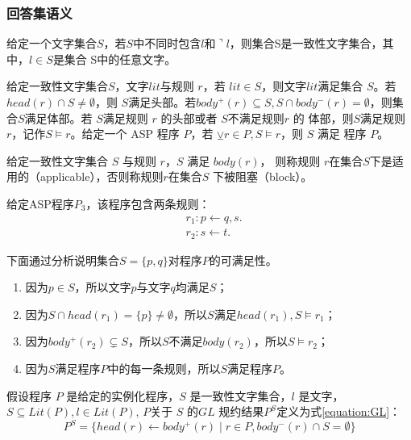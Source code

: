\subsubsection{回答集语义}
\begin{definition}[一致性文字集合]
    给定一个文字集合$S$，若$S$中不同时包含$l$和$\urcorner l$，则集合S是一致性文字集合，其中，$l \in S$是集合
    S中的任意文字。
\end{definition}
\begin{definition}
    给定一致性文字集合$S$，文字$lit$与规则 $r$，若
$lit \in S$，则文字$ lit $满足集合 $S$。若 $head(r)\cap S \neq \emptyset$，则 $S $满足头部。若$ body^+(r) \subseteq 
S, S ∩ body^−(r) = \emptyset$，则集合$ S $满足体部。若 $S $满足规则 $r$ 的头部或者 $S $不满足规则$ r$ 的
体部，则$ S$满足规则 $r$，记作$ S \models r$。给定一个 ASP 程序 $P$，若 $\veebar r \in P, S \models r$，则 $S$ 满足
程序 $P$。
\end{definition}
\begin{definition}[规则的适用与阻塞]
    给定一致性文字集合 $S$ 与规则 $r$，$S$ 满足 $body(r)$，
则称规则 $r $在集合$S $下是适用的（applicable），否则称规则$ r $在集合$ S$ 下被阻塞（block）。
\end{definition}
\begin{example}
    给定ASP程序$P_3$，该程序包含两条规则：
    \begin{align*}
        &r_1: p \leftarrow q, s. \\ 
        &r_2: s \leftarrow t.
    \end{align*}
\end{example}
下面通过分析说明集合$S=\{ p, q\}$对程序$P$的可满足性。
\begin{enumerate}[nosep]
    \item 因为$p\in S$，所以文字$p$与文字$q$均满足$S$；
    \item 因为$S \cap head(r_1) = \{ p \} \neq \emptyset$，所以$S$满足$head(r_1), S \models r_1$；
    \item 因为$body^+(r_2) \subsetneq S$，所以$S$不满足$body(r_2)$，所以$S \models r_2$；
    \item 因为$S$满足程序$P$中的每一条规则，所以$S$满足程序$P$。
\end{enumerate}
\begin{definition}
    假设程序 $P$ 是给定的实例化程序，$S$
是一致性文字集合，$l$ 是文字，$S \subseteq  Lit(P), l \in Lit(P)$, $P $关于 $S$ 的$ GL$ 规约结果$ P^S$定义为式\eqref{equation:GL}：
\begin{equation}
    P^S = \{ head(r) \leftarrow body^+(r) \mid r \in P, body^-(r) \cap S = \emptyset \} \label{equation:GL}
\end{equation}
\end{definition}
